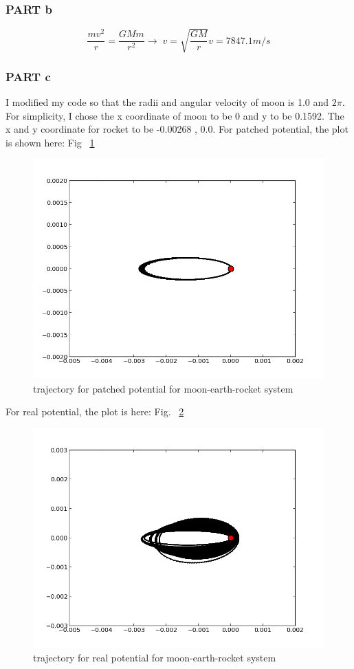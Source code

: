 \documentclass[11pt,letterpaper]{article}
\begin{document}
\subsubsection{PART b}
$$
\frac{mv^2}{r}=\frac{GMm}{r^2} 
\longrightarrow\; v=\sqrt{\frac{GM}{r}}
v=7847.1 m/s
$$

\subsubsection{PART c}

I modified my code so that the radii and angular velocity of moon is 1.0 and $2\pi$. For simplicity, I chose the x coordinate of moon to be 0 and y to be 0.1592. The x and y coordinate for rocket to be -0.00268 , 0.0. 
For patched potential, the plot is shown here: Fig ~\ref{figure4} 

\begin{figure}
\begin{center}
\includegraphics[width=0.8\linewidth,angle=0]{p2c_patched.png}
\caption{trajectory for patched potential for moon-earth-rocket system}
\label{figure4}
\end{center}
\end{figure}

For real potential, the plot is here: Fig. ~\ref{figure5}

\begin{figure}
\begin{center}
\includegraphics[width=0.8\linewidth,angle=0]{p2c_real.png}
\caption{trajectory for real potential for moon-earth-rocket system}
\label{figure5}
\end{center}
\end{figure}
\end{document}
